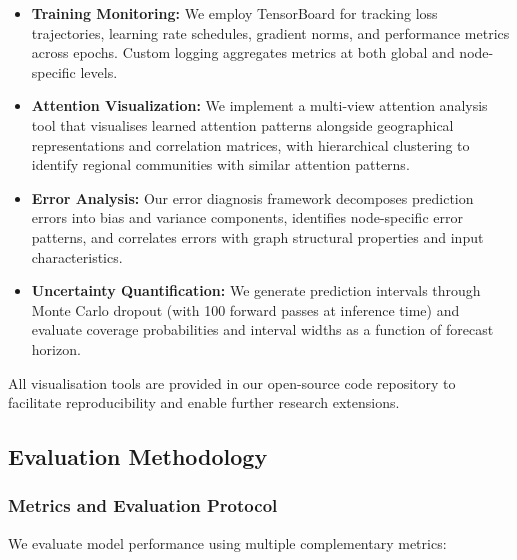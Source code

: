 \documentclass[lettersize, journal]{IEEEtran}
\begin{document}
\begin{itemize}
    \item \textbf{Training Monitoring:} We employ TensorBoard for tracking loss trajectories, learning rate schedules, gradient norms, and performance metrics across epochs. Custom logging aggregates metrics at both global and node-specific levels.
    
    \item \textbf{Attention Visualization:} We implement a multi-view attention analysis tool that visualises learned attention patterns alongside geographical representations and correlation matrices, with hierarchical clustering to identify regional communities with similar attention patterns.
    
    \item \textbf{Error Analysis:} Our error diagnosis framework decomposes prediction errors into bias and variance components, identifies node-specific error patterns, and correlates errors with graph structural properties and input characteristics.
    
    \item \textbf{Uncertainty Quantification:} We generate prediction intervals through Monte Carlo dropout (with 100 forward passes at inference time) and evaluate coverage probabilities and interval widths as a function of forecast horizon.
\end{itemize}

All visualisation tools are provided in our open-source code repository to facilitate reproducibility and enable further research extensions.

\subsection{Evaluation Methodology}

\subsubsection{Metrics and Evaluation Protocol}
We evaluate model performance using multiple complementary metrics:
\end{document}
